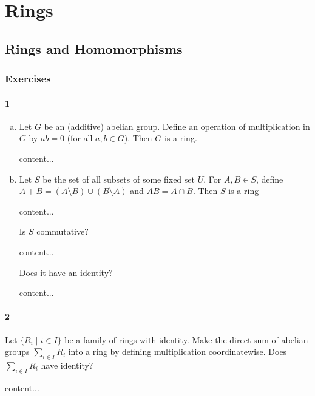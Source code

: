 \chapter{Rings}


\section{Rings and Homomorphisms}

\subsection{Exercises}

\subsubsection*{1}
\begin{enumerate}[(a)]
	\item
	\begin{graybox}
		Let $G$ be an (additive) abelian group. Define an operation of multiplication in $G$ by $ab = 0$ (for all $a, b\in G$). Then $G$ is a ring.
	\end{graybox}
	\begin{solution}
		content...
	\end{solution}
	\item
	\begin{graybox}
		Let $S$ be the set of all subsets of some fixed set $U$. For $A, B \in S$, define $A + B = (A \setminus B) \cup (B \setminus A)$ and $AB = A \cap B$. Then $S$ is a ring
	\end{graybox}
	\begin{solution}
		content...
	\end{solution}
	\begin{lightgraybox}
		Is $S$ commutative?
	\end{lightgraybox}
	
	\begin{solution}
		content...
	\end{solution}
	\begin{lightgraybox}
		Does it have an identity?
	\end{lightgraybox}
	\begin{solution}
		content...
	\end{solution}
\end{enumerate}

\subsubsection*{2}
\begin{graybox}
	Let $\{R_i \mid i \in I\}$ be a family of rings with identity. Make the direct sum of abelian groups $\sum_{i \in I} R_i$ into a ring by defining multiplication coordinatewise. Does $\sum_{i \in I}R_i$ have identity?
\end{graybox}
\begin{solution}
	content...
\end{solution}

